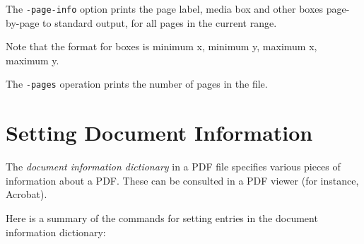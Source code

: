 \documentclass{book}
\newcommand{\smallgap}{\bigskip}
\begin{document}
\vspace{4mm}
The \texttt{-page-info} option prints the page label, media box and other boxes
page-by-page to standard output, for all pages in the current range.

\noindent{}

\noindent Note that the format for boxes is minimum x, minimum y, maximum x, maximum y.

\smallgap 
\noindent The \texttt{-pages} operation prints the number of pages in the file.

\noindent{}


\section{Setting Document Information}
\label{setdocinfo}
  The \textit{document information dictionary} in a PDF file specifies various
pieces of information about a PDF. These can be consulted in a PDF viewer (for
instance, Acrobat).

  Here is a summary of the commands for setting entries in the document
information dictionary:
\end{document}
